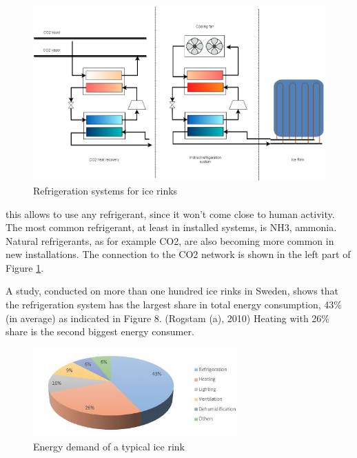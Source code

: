 \documentclass{article}
\begin{document}
\begin{figure}[h!]
\centering
\includegraphics[width=1\textwidth]{IceRink_refrigeration.png}
\caption{Refrigeration systems for ice rinks}
\label{fig:IR_refSystem}
\end{figure}

this allows to use any refrigerant, since it won't come close to human activity. The most common refrigerant, at least in installed systems, is NH3, ammonia. Natural refrigerants, as for example CO2, are also becoming more common in new installations. 
The connection to the CO2 network is shown in the left part of Figure \ref{fig:IR_refSystem}.

A study, conducted on more than one hundred ice rinks in Sweden, shows that the refrigeration system has the largest share in total energy consumption, 43\% (in average) as indicated in Figure 8. (Rogstam (a), 2010) Heating with 26\% share is the second biggest energy consumer.
\cite{karampourMEASUREMENTMODELLINGICE}

\begin{figure}[h!]
\centering
\includegraphics[width=0.7\textwidth]{IR_energyDemand.JPG}
\caption{Energy demand of a typical ice rink \cite{karampourMEASUREMENTMODELLINGICE}}
\label{fig:IR_energyDemand}
\end{figure}
\end{document}
